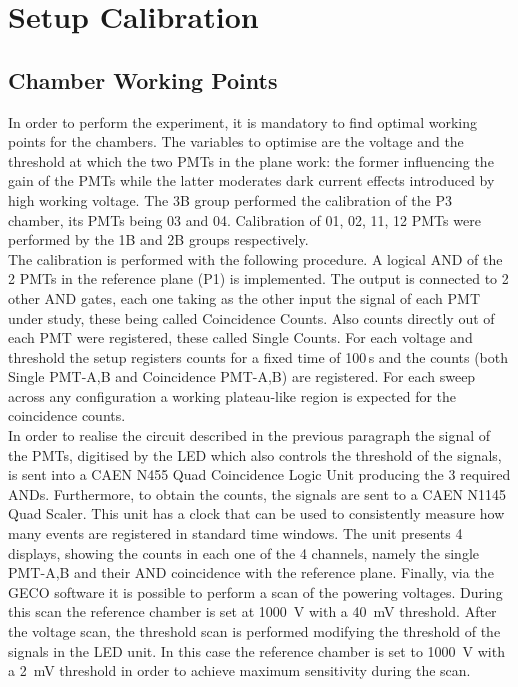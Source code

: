 \documentclass[../main.tex]{subfiles}
\begin{document}
\section{Setup Calibration}

\subsection{Chamber Working Points}
\label{subsec:chambercalibration}
In order to perform the experiment, it is mandatory to find optimal working points for the chambers. The variables to optimise are the voltage and the threshold at which the two PMTs in the plane work: the former influencing the gain of the PMTs while the latter moderates dark current effects introduced by high working voltage. The 3B group performed the calibration of the P3 chamber, its PMTs being 03 and 04. Calibration of 01, 02, 11, 12 PMTs were performed by the 1B and 2B groups respectively.\\

The calibration is performed with the following procedure. A logical AND of the 2 PMTs in the reference plane (P1) is implemented. The output is connected to 2 other AND gates, each one taking as the other input the signal of each PMT under study, these being called Coincidence Counts. Also counts directly out of each PMT were registered, these called Single Counts. For each voltage and threshold the setup registers counts for a fixed time of 100\,s and the counts (both Single PMT-A,B and Coincidence PMT-A,B) are registered. For each sweep across any configuration a working plateau-like region is expected for the coincidence counts.\\

In order to realise the circuit described in the previous paragraph the signal of the PMTs, digitised by the LED which also controls the threshold of the signals, is sent into a CAEN N455 Quad Coincidence Logic Unit producing the 3 required ANDs. Furthermore, to obtain the counts, the signals are sent to a CAEN N1145 Quad Scaler. This unit has a clock that can be used to consistently measure how many events are registered in standard time windows. The unit presents 4 displays, showing the counts in each one of the 4 channels, namely the single PMT-A,B and their AND coincidence with the reference plane. Finally, via the GECO software it is possible to perform a scan of the powering voltages. During this scan the reference chamber is set at \SI{1000}{\volt} with a \SI{40}{\milli \volt} threshold. After the voltage scan, the threshold scan is performed modifying the threshold of the signals in the LED unit. In this case the reference chamber is set to \SI{1000}{\volt} with a \SI{2}{\milli \volt} threshold in order to achieve maximum sensitivity during the scan.\\
\end{document}
